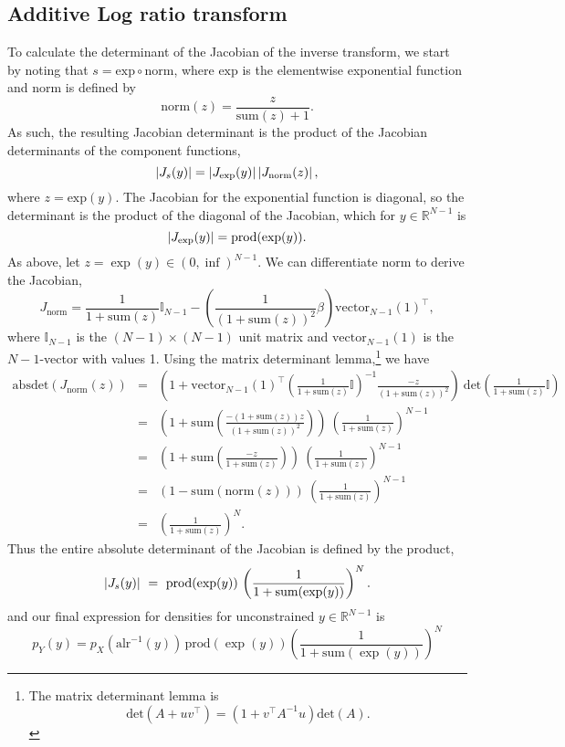 \begin{appendices}
\subsection{Additive Log ratio transform}
To calculate the determinant of the Jacobian of the inverse transform,
we start by noting that $s = \textrm{exp} \circ \textrm{norm}$, where
$\textrm{exp}$ is the elementwise exponential function and
\textrm{norm} is defined by
\[
  \textrm{norm}(z) = \frac{z}{\textrm{sum}(z) + 1}.
\]
As such, the resulting Jacobian determinant is the product of the
Jacobian determinants of the component functions,
\[
  \left| J_s(y) \right|
  = \left| J_{\textrm{exp}}(y) \right| \left| J_{\textrm{norm}}(z) \right|,
\]
where $z = \textrm{exp}(y)$.  The Jacobian for the exponential
function is diagonal, so the determinant is the product of the
diagonal of the Jacobian, which for $y \in \mathbb{R}^{N-1}$ is
\[
  \left| J_{\textrm{exp}}(y) \right| = \textrm{prod}(\exp(y)).
\]
As above, let $z = \exp(y) \in (0, \inf)^{N-1}$.  We can differentiate
$\textrm{norm}$ to derive the Jacobian,
\[
  J_{\textrm{norm}}
  = \frac{1}{1 + \textrm{sum}(z)} \mathbb{I}_{N-1}
  - \left(\frac{1}{(1 + \textrm{sum}(z))^2} \beta \right)
  \textrm{vector}_{N-1}(1)^{\top},
\]
where $\mathbb{I}_{N-1}$ is the $(N - 1) \times (N - 1)$ unit matrix and
$\textrm{vector}_{N-1}(1)$ is the $N - 1$-vector with values 1.  Using
the matrix determinant lemma,\footnote{The matrix determinant lemma
  is \[\textrm{det}(A + u v^{\top}) = (1 + v^{\top} A^{-1} u)
    \textrm{det}(A).\]}
we have
\begin{eqnarray*}
  \textrm{absdet}(J_{\textrm{norm}}(z))
  & = &
  \left(
    1
    + \textrm{vector}_{N-1}(1)^{\top}
    \left(\frac{1}{1 + \textrm{sum}(z)} \mathbb{I} \right)^{-1}
    \frac{-z}{(1 + \textrm{sum}(z))^2}
    \right)
    \ \textrm{det}\left(\frac{1}{1 + \textrm{sum}(z)} \mathbb{I}
        \right)
  \\[6pt]
  & = &
  \left(
    1 
    + \textrm{sum}\left( \frac{-(1 + \textrm{sum}(z)) z}{(1 +
        \textrm{sum}(z))^2} \right)
  \right)
        \ \left( \frac{1}{1 + \textrm{sum}(z)} \right)^{N-1}
  \\[6pt]
  & = &
        \left(1 + \textrm{sum}\left(\frac{-z}{1 + \textrm{sum}(z)} \right)\right)        
        \ \left( \frac{1}{1 + \textrm{sum}(z)} \right)^{N-1}
  \\[6pt]
  & = & \left( 1 - \textrm{sum}(\textrm{norm}(z)) \right) 
        \ \left( \frac{1}{1 + \textrm{sum}(z)} \right)^{N-1}
  \\[6pt]
  & = & \left( \frac{1}{1 + \textrm{sum}(z)} \right)^N.
\end{eqnarray*}
Thus the entire absolute determinant of the Jacobian is defined by the
product, 
\[
  \left| J_s(y) \right|
  \ = \
  \textrm{prod}(\exp(y))
  \, \left( \frac{1}{1 + \textrm{sum}(\exp(y))} \right)^N.
\]
and our final expression for densities for unconstrained $y \in
\mathbb{R}^{N-1}$ is
\[
  p_Y(y)
  = p_X(\textrm{alr}^{-1}(y))
  \, \textrm{prod}(\exp(y))
  \left( \frac{1}{1 + \textrm{sum}(\exp(y))} \right)^N
\]


\end{appendices}
